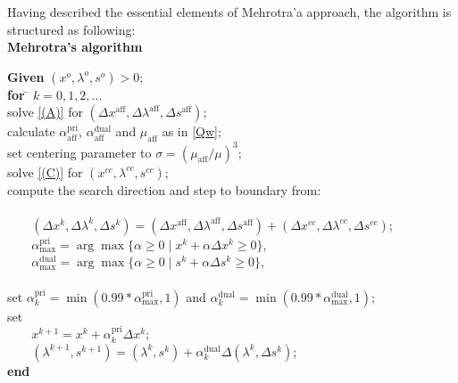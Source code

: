 \documentclass[a4paper,10 pt,titlepage,twoside]{book}
\theoremstyle{plain}
\theoremstyle{definition}
\theoremstyle{remark}
\begin{document}
 Having described the essential elements of Mehrotra'a approach, the algorithm is structured as following:
\\
\textbf{Mehrotra's algorithm}
\begin{tabbing}
	\textbf{Given} $(x^{o}, \lambda^{o}, s^{o})> 0$; \\
	\textbf{for} \= $k = 0, 1, 2,...$ \\
	\> solve \ref{(A)} for $(\Delta x^{\text{aff}},\Delta \lambda^{\text{aff}},\Delta s^{\text{aff}})$;\\
	\> calculate $\alpha_{\text{aff}}^{\text{pri}}$, $\alpha_{\text{aff}}^{\text{dual}}$ and $\mu_{\text{aff}}$ as in \ref{Qw};\\
	\> set centering parameter to $\sigma = (\mu_{\text{aff}}/\mu)^{3}$; \\
	\> solve \ref{(C)} for $(x^{cc},\lambda^{cc},s^{cc})$;\\
	\> compute the search direction and step to boundary from: \\
	\> \\
	\> $\;\;\;\;\;\;\;(\Delta x^{k},\Delta \lambda^{k},\Delta s^{k})=(\Delta x^{\text{aff}},\Delta \lambda^{\text{aff}},\Delta s^{\text{aff}})+(\Delta x^{cc},\Delta  \lambda^{cc},\Delta s^{cc})$;\\
	\> $\;\;\;\;\;\;\;\alpha_{\text{max}}^{\text{pri}}=\arg\max\{\alpha\geq0\;|\;x^{k} +\alpha\Delta x^{k}\geq 0\}$,\\
	\> $\;\;\;\;\;\;\;\alpha_{\text{max}}^{\text{dual}}=\arg\max\{\alpha\geq0\;|\;s^{k} +\alpha\Delta s^{k}\geq 0\}$,\\
	\>\\
	\> set $\alpha_{k}^{\text{pri}}=\min(0.99\ast\alpha_{\text{max}}^{\text{pri}},1)$ and $\alpha_{k}^{\text{dual}}=\min(0.99\ast\alpha_{\text{max}}^{\text{dual}},1)$;\\
	\> set\\
	\> $\;\;\;\;\;\;\;x^{k+1} = x^{k} + \alpha_{k}^{\text{pri}}\Delta x^{k}$;\\
	\>$\;\;\;\;\;\;\;(\lambda^{k+1},s^{k+1}) = (\lambda^{k},s^{k}) + \alpha_{k}^{\text{dual}}\Delta (\lambda^{k},\Delta s^{k})$;\\
\textbf{end}
\end{tabbing}
\end{document}
